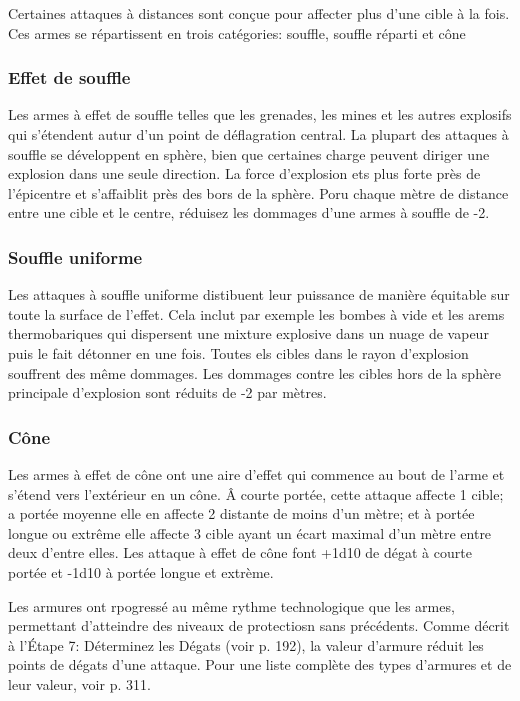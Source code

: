 Certaines attaques à distances sont conçue pour affecter plus d'une cible à la fois. Ces armes se répartissent en trois catégories: souffle, souffle réparti et cône 

\subsubsection{Effet de souffle} 

Les armes à effet de souffle telles que les grenades, les mines et les autres explosifs qui s'étendent autur d'un point de déflagration central. La plupart des attaques à souffle se développent en sphère, bien que certaines charge peuvent diriger une explosion dans une seule direction. La force d'explosion ets plus forte près de l'épicentre et s'affaiblit près des bors de la sphère. Poru chaque mètre de distance entre une cible et le centre, réduisez les dommages d'une armes à souffle de -2. 

\subsubsection{Souffle uniforme} 

Les attaques à souffle uniforme distibuent leur puissance de manière équitable sur toute la surface de l'effet. Cela inclut par exemple les bombes à vide et les arems thermobariques qui dispersent une mixture explosive dans un nuage de vapeur puis le fait détonner en une fois. Toutes els cibles dans le rayon d'explosion souffrent des même dommages. Les dommages contre les cibles hors de la sphère principale d'explosion sont réduits de -2 par mètres. 

\subsubsection{Cône} 

Les armes à effet de cône ont une aire d'effet qui commence au bout de l'arme et s'étend vers l'extérieur en un cône. Â courte portée, cette attaque affecte 1 cible; a portée moyenne elle en affecte 2 distante de moins d'un mètre; et à portée longue ou extrême elle affecte 3 cible ayant un écart maximal d'un mètre entre deux d'entre elles. Les attaque à effet de cône font +1d10 de dégat à courte portée et -1d10 à portée longue et extrème. 

\label{sec:combat-armor} 

Les armures ont rpogressé au même rythme technologique que les armes, permettant d'atteindre des niveaux de protectiosn sans précédents. Comme décrit à l'Étape 7: Déterminez les Dégats (voir p. 192), la valeur d'armure réduit les points de dégats d'une attaque. Pour une liste complète des types d'armures et de leur valeur, voir p. 311. 

